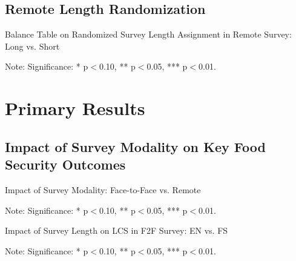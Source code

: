 \documentclass[11pt,harvard]{article}
\begin{document}
	\pagebreak
	
\subsection{Remote Length Randomization}
\begin{table}[htbp]
	\centering
	\begin{adjustbox}{max width=\textwidth}
		\begin{threeparttable}
			\caption{Balance Table on Randomized Survey Length Assignment in Remote Survey: Long vs. Short}
			\scriptsize
			 
			\label{tab:Myanmar_Demo_RM_Length_Balance}
			\begin{tablenotes}
				\item Note: Significance: * p$<$0.10, ** p$<$0.05, *** p$<$0.01. 
			\end{tablenotes}
		\end{threeparttable}
	\end{adjustbox}
\end{table}

\pagebreak

\section{Primary Results}
\subsection{Impact of Survey Modality on Key Food Security Outcomes}
\begin{table}[htbp]
	\centering
	\begin{adjustbox}{max width=\textwidth}
		\begin{threeparttable}
			\caption{Impact of Survey Modality: Face-to-Face vs. Remote}
			\scriptsize
			 
			\label{tab:Myanmar_Outcome_Modality_Balance}
			\begin{tablenotes}
				\item Note: Significance: * p$<$0.10, ** p$<$0.05, *** p$<$0.01. 
			\end{tablenotes}
		\end{threeparttable}
	\end{adjustbox}
\end{table}

\begin{table}[htbp]
	\centering
	\begin{adjustbox}{max width=\textwidth}
		\begin{threeparttable}
			\caption{Impact of Survey Length on LCS in F2F Survey: EN vs. FS}
			\scriptsize
			 
			\label{tab:Myanmar_LCS_F2F_Length_Balance}
			\begin{tablenotes}
				\item Note: Significance: * p$<$0.10, ** p$<$0.05, *** p$<$0.01. 
			\end{tablenotes}
		\end{threeparttable}
	\end{adjustbox}
\end{table}
\end{document}

